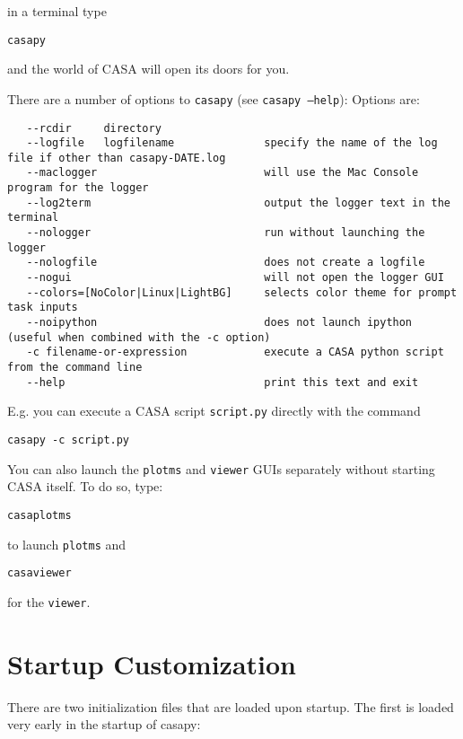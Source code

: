 in a terminal type\\
\small
\begin{verbatim}
casapy
\end{verbatim}
\normalsize

and the world of CASA will open its doors for you. 

There are a number of options to {\tt casapy} (see {\tt casapy --help}):
Options are: 
\small
\begin{verbatim}
   --rcdir     directory
   --logfile   logfilename              specify the name of the log file if other than casapy-DATE.log
   --maclogger                          will use the Mac Console program for the logger
   --log2term                           output the logger text in the terminal
   --nologger                           run without launching the logger
   --nologfile                          does not create a logfile 
   --nogui                              will not open the logger GUI 
   --colors=[NoColor|Linux|LightBG]     selects color theme for prompt task inputs
   --noipython                          does not launch ipython (useful when combined with the -c option)
   -c filename-or-expression            execute a CASA python script from the command line 
   --help                               print this text and exit
\end{verbatim}
\normalsize

E.g. you can execute a CASA script {\tt script.py} directly with the command
\small
\begin{verbatim}
casapy -c script.py
\end{verbatim}
\normalsize


You can also launch the {\tt plotms} and {\tt viewer} GUIs separately
without starting CASA itself. To do so, type:

\small
\begin{verbatim}
casaplotms
\end{verbatim}
\normalsize
to launch {\tt plotms} and 
\small
\begin{verbatim}
casaviewer
\end{verbatim}
\normalsize
for the {\tt viewer}.




\section{Startup Customization}
\label{section:install.customization}

There are two initialization files that are loaded upon startup. The
first is loaded very early in the startup of casapy:

